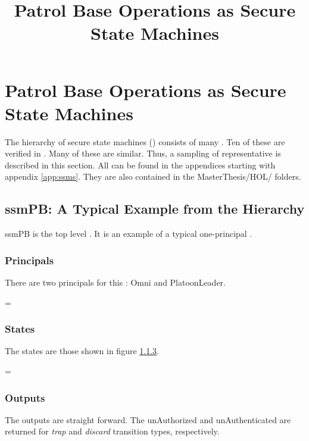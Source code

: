 \documentclass[../../main/main.tex]{subfiles}
\begin{document}
\title{Patrol Base Operations as Secure State Machines}


\chapter{Patrol Base Operations as Secure State Machines} \label{chp:pbssm}
The hierarchy of secure state machines () consists of many .  Ten of these  are verified in .  Many of these  are similar.  Thus, a sampling of representative  is described in this section.  All  can be found in the appendices starting with appendix \ref{app:ssms}.  They are also contained in the MasterThesis/HOL/ folders.

\section{ssmPB: A Typical Example from the Hierarchy}\label{sec:ssmpb}
ssmPB is the top level .  It is an example of a typical one-principal .

\subsection{Principals}
There are two principals for this : Omni and PlatoonLeader. 

 =  \HOLTokenBar{} 

\subsection{States}
The states are those shown in figure \ref{}.

 =  \HOLTokenBar{}  \HOLTokenBar{}  \HOLTokenBar{} 
        \HOLTokenBar{}  \HOLTokenBar{} 

\subsection{Outputs}
The outputs are straight forward.  The unAuthorized and unAuthenticated are returned for \textit{trap} and \textit{discard} transition types, respectively.
\end{document}
